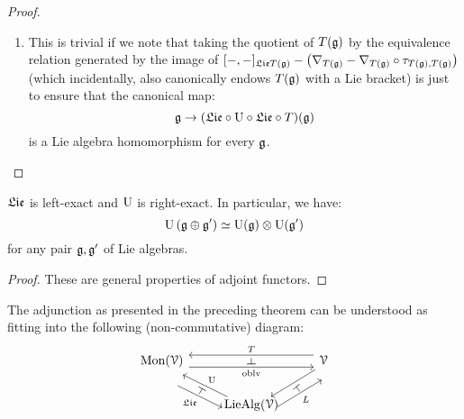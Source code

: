 \begin{proof}
\begin{enumerate}
                        \item This is trivial if we note that taking the quotient of $T(\mathfrak{g})$ by the equivalence relation generated by the image of $[-,-]_{\mathfrak{Lie} T(\mathfrak{g})} - \left(\nabla_{T(\mathfrak{g})} - \nabla_{T(\mathfrak{g})} \circ \tau_{T(\mathfrak{g}), T(\mathfrak{g})}\right)$ (which incidentally, also canonically endows $T(\mathfrak{g})$ with a Lie bracket) is just to ensure that the canonical map:
                            $$\mathfrak{g} \to (\mathfrak{Lie} \circ \mathrm{U} \circ \mathfrak{Lie} \circ T)(\mathfrak{g})$$
                        is a Lie algebra homomorphism for every $\mathfrak{g}$.
                    \end{enumerate}
                \end{proof}
            \begin{corollary}
                $\mathfrak{Lie}$ is left-exact and $\mathrm{U}$ is right-exact. In particular, we have:
                    $$\U\left(\g \oplus \g'\right) \cong \U(\g) \tensor \U(\g')$$
                for any pair $\mathfrak{g}, \mathfrak{g}'$ of Lie algebras. 
            \end{corollary}
                \begin{proof}
                    These are general properties of adjoint functors.
                \end{proof}
            \begin{remark}
                The adjunction as presented in the preceding theorem can be understood as fitting into the following (non-commutative) diagram:
                    $$
                        \begin{tikzcd}
                        	{\Mon(\calV)} & {} & {\calV} \\
                        	& {\Lie\Alg(\calV)}
                        	\arrow["{\oblv}"{name=0, swap}, from=1-1, to=1-3, shift right=2]
                        	\arrow["{T}"{name=1, swap}, from=1-3, to=1-1, shift right=2]
                        	\arrow["{L}"{name=2, swap}, from=2-2, to=1-3, shift right=5]
                        	\arrow[""{name=3, inner sep=0}, from=1-3, to=2-2, shift left=1]
                        	\arrow["{\U}"{name=4, swap}, from=2-2, to=1-1, shift left=1]
                        	\arrow["{\frakLie}"{name=5, swap}, from=1-1, to=2-2, shift right=5]
                        	\arrow["\dashv"{rotate=-90}, from=1, to=0, phantom]
                        	\arrow["\dashv"{rotate=61}, from=5, to=4, phantom]
                        	\arrow["\dashv"{rotate=129}, from=2, to=3, phantom]
                        \end{tikzcd}
                    $$
            \end{remark}
